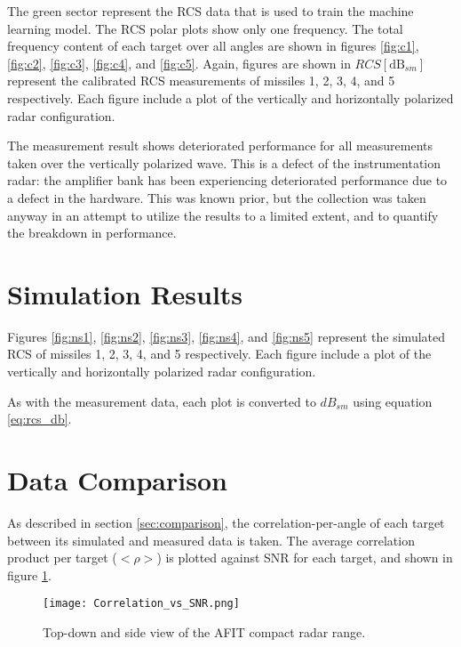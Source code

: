 	The green sector represent the RCS data that is used to train the machine learning model. The RCS polar plots show only one frequency. The total frequency content of each target over all angles are shown in figures \ref{fig:c1}, \ref{fig:c2}, \ref{fig:c3}, \ref{fig:c4}, and \ref{fig:c5}. Again, figures are shown in $RCS [\textrm{dB}_{sm}]$ represent the calibrated RCS measurements of missiles 1, 2, 3, 4, and 5 respectively. Each figure include a plot of the vertically and horizontally polarized radar configuration.

	The measurement result shows deteriorated performance for all measurements taken over the vertically polarized wave. This is a defect of the instrumentation radar:  the amplifier bank has been experiencing deteriorated performance due to a defect in the hardware. This was known prior, but the collection was taken anyway in an attempt to utilize the results to a limited extent, and to quantify the breakdown in performance.

\section{Simulation Results}
\label{sec:sim_res}

    Figures \ref{fig:ns1}, \ref{fig:ns2}, \ref{fig:ns3}, \ref{fig:ns4}, and \ref{fig:ns5} represent the simulated RCS of missiles 1, 2, 3, 4, and 5 respectively. Each figure include a plot of the vertically and horizontally polarized radar configuration.

		As with the measurement data, each plot is converted to $dB_{sm}$ using equation \ref{eq:rcs_db}.

\section{Data Comparison}
\label{sec:data_comparison}

	As described in section \ref{sec:comparison}, the correlation-per-angle of each target between its simulated and measured data is taken. The average correlation product per target ($<\rho>$) is plotted against SNR for each target, and shown in figure \ref{fig:correlation_results_snr}.

	\begin{figure}[htbp!]
    \centering
    \texttt{[image: Correlation\_vs\_SNR.png]}
    \caption[Average Correlation vs SNR]{Top-down and side view of the AFIT compact radar range.}
    \label{fig:correlation_results_snr}
  \end{figure}


